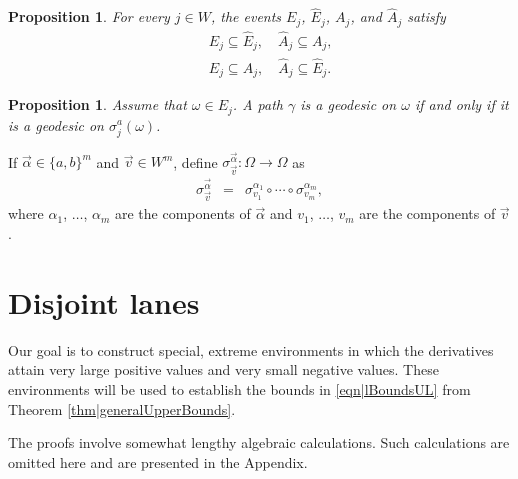 \documentclass[reqno]{amsart}
\newtheorem{proposition}[theorem]{Proposition}
\begin{document}
 

\begin{proposition} For every $j\in W$, the events $E_j$, $\hat E_j$, $A_j$, and $\hat A_j$ satisfy
\begin{eqnarray}
&&E_j\subseteq \hat E_j,\quad \hat A_j\subseteq A_j,
\nonumber\\
&&E_j\subseteq A_j ,\quad \hat A_j\subseteq \hat E_j.
\label{eqn:EAinclusion}
\end{eqnarray}
\end{proposition} 
  
  


\begin{proposition} \label{thm|MonotonicityOfGeodesic} Assume that $\omega\in E_j$. A path $\gamma$ is a geodesic on $\omega$ if and only if it is a geodesic on $\sigma_j^a(\omega)$. 
\end{proposition}
  
 
 
If $\overrightarrow \alpha\in \{a,b\}^m$ and $\overrightarrow v\in W^m$, define $\sigma_{\overrightarrow v}^{\overrightarrow\alpha}:\Omega\to \Omega$ as 
\begin{eqnarray}
\sigma_{\overrightarrow v}^{\overrightarrow\alpha}&=&\sigma_{v_1}^{\alpha_1}\circ\cdots\circ\sigma_{v_m}^{\alpha_m},
\label{eqn|MultiDimensionSigma}
\end{eqnarray}
where $\alpha_1$, $\dots$, $\alpha_m$ are the components of $\overrightarrow\alpha$ and $v_1$, $\dots$, $v_m$ are the components of $\overrightarrow v$.

 
 

   
 
 
 
 
 
    
 


\section{Disjoint lanes} \label{sec|Dls}
Our goal is to construct special, extreme environments in which the derivatives attain very large positive values and very small negative values. These environments will be used to establish the bounds in \eqref{eqn|lBoundsUL} from Theorem \ref{thm|generalUpperBounds}.  

The proofs involve somewhat lengthy algebraic calculations. Such calculations are omitted here and are presented in the Appendix.
\end{document}
